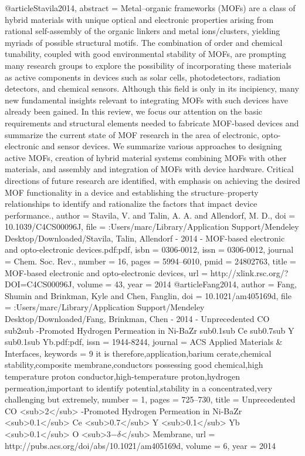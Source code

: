 @article{Stavila2014,
abstract = {Metal–organic frameworks (MOFs) are a class of hybrid materials with unique optical and electronic properties arising from rational self-assembly of the organic linkers and metal ions/clusters, yielding myriads of possible structural motifs. The combination of order and chemical tunability, coupled with good environmental stability of MOFs, are prompting many research groups to explore the possibility of incorporating these materials as active components in devices such as solar cells, photodetectors, radiation detectors, and chemical sensors. Although this field is only in its incipiency, many new fundamental insights relevant to integrating MOFs with such devices have already been gained. In this review, we focus our attention on the basic requirements and structural elements needed to fabricate MOF-based devices and summarize the current state of MOF research in the area of electronic, opto-electronic and sensor devices. We summarize various approaches to designing active MOFs, creation of hybrid material systems combining MOFs with other materials, and assembly and integration of MOFs with device hardware. Critical directions of future research are identified, with emphasis on achieving the desired MOF functionality in a device and establishing the structure–property relationships to identify and rationalize the factors that impact device performance.},
author = {Stavila, V. and Talin, A. A. and Allendorf, M. D.},
doi = {10.1039/C4CS00096J},
file = {:Users/marc/Library/Application Support/Mendeley Desktop/Downloaded/Stavila, Talin, Allendorf - 2014 - MOF-based electronic and opto-electronic devices.pdf:pdf},
isbn = {0306-0012},
issn = {0306-0012},
journal = {Chem. Soc. Rev.},
number = {16},
pages = {5994--6010},
pmid = {24802763},
title = {{MOF-based electronic and opto-electronic devices}},
url = {http://xlink.rsc.org/?DOI=C4CS00096J},
volume = {43},
year = {2014}
}
@article{Fang2014,
author = {Fang, Shumin and Brinkman, Kyle and Chen, Fanglin},
doi = {10.1021/am405169d},
file = {:Users/marc/Library/Application Support/Mendeley Desktop/Downloaded/Fang, Brinkman, Chen - 2014 - Unprecedented CO sub2sub -Promoted Hydrogen Permeation in Ni-BaZr sub0.1sub Ce sub0.7sub Y sub0.1sub Yb.pdf:pdf},
issn = {1944-8244},
journal = {ACS Applied Materials {\&} Interfaces},
keywords = {9 it is therefore,application,barium cerate,chemical stability,composite membrane,conductors possessing good chemical,high temperature proton conductor,high-temperature proton,hydrogen permeation,important to identify potential,stability in a concentrated,very challenging but extremely},
number = {1},
pages = {725--730},
title = {{Unprecedented CO {\textless}sub{\textgreater}2{\textless}/sub{\textgreater} -Promoted Hydrogen Permeation in Ni-BaZr {\textless}sub{\textgreater}0.1{\textless}/sub{\textgreater} Ce {\textless}sub{\textgreater}0.7{\textless}/sub{\textgreater} Y {\textless}sub{\textgreater}0.1{\textless}/sub{\textgreater} Yb {\textless}sub{\textgreater}0.1{\textless}/sub{\textgreater} O {\textless}sub{\textgreater}3−$\delta${\textless}/sub{\textgreater} Membrane}},
url = {http://pubs.acs.org/doi/abs/10.1021/am405169d},
volume = {6},
year = {2014}
}
